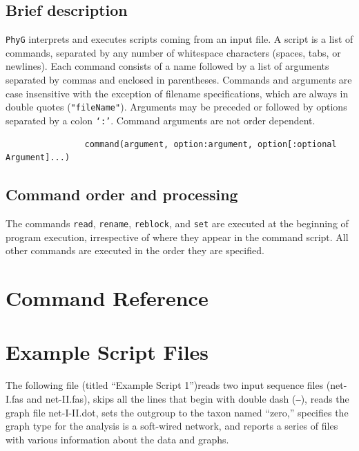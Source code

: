 \documentclass[11pt]{book}
\newcommand{\phyg}{\texttt{PhyG} }
\begin{document}
{{	\subsection{Brief description}
		\phyg interprets and executes scripts coming from an input file. A script is a list of commands, 
		separated by any number of whitespace characters (spaces, tabs, or newlines). Each command 
		consists of a name followed by a list of arguments separated by commas and enclosed in 
		parentheses. Commands and arguments are case insensitive with the exception of filename 
		specifications, which are always in double quotes (\texttt{"fileName"}).  Arguments may be 
		preceded or followed by options separated by a colon \texttt{`:'}.  Command arguments are 
		not order dependent.

			\begin{verbatim}
				command(argument, option:argument, option[:optional Argument]...)
			\end{verbatim}

	\subsection{Command order and processing}
		The commands \texttt{read}, \texttt{rename}, \texttt{reblock}, and \texttt{set} are executed at
		the beginning of program execution, irrespective of where they appear in the command script.  
		All other commands are executed in the order they are specified.


	\section{Command Reference}
	
	
	\section{Example Script Files}
	The following file (titled ``Example Script 1'')reads two input sequence files (net-I.fas and net-II.fas), skips all 
	the lines that begin with double dash (\texttt{--}), reads the graph file net-I-II.dot, sets the outgroup to the taxon 
	named ``zero,'' specifies the graph type for the analysis is a soft-wired network, and 	reports a series of files 
	with various information about the data and graphs.
	
}}
\end{document}
